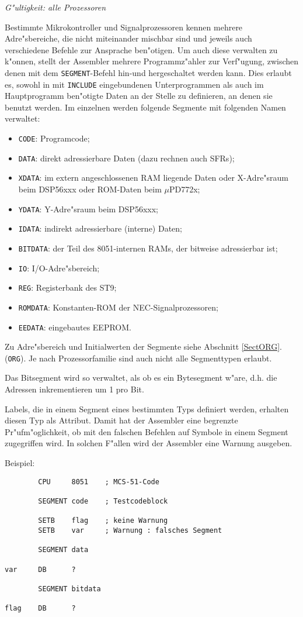 \documentclass[12pt,a4paper,twoside]{report}
\newcommand{\tty}[1]{{\tt #1}}
\begin{document}
{\em G"ultigkeit: alle Prozessoren}

Bestimmte Mikrokontroller und Signalprozessoren kennen mehrere
Adre"sbereiche, die nicht miteinander mischbar sind und jeweils auch
verschiedene Befehle zur Ansprache ben"otigen.  Um auch diese verwalten zu
k"onnen, stellt der Assembler mehrere Programmz"ahler zur Verf"ugung,
zwischen denen mit dem
\tty{SEGMENT}-Befehl hin-und hergeschaltet werden kann.  Dies erlaubt es,
sowohl in mit \tty{INCLUDE} eingebundenen Unterprogrammen als auch im
Hauptprogramm ben"otigte Daten an der Stelle zu definieren, an denen
sie benutzt werden.  Im einzelnen werden folgende Segmente mit folgenden
Namen verwaltet:
\begin{itemize}
\item{\tty{CODE}: Programcode;}
\item{\tty{DATA}: direkt adressierbare Daten (dazu rechnen auch SFRs);}
\item{\tty{XDATA}: im extern angeschlossenen RAM liegende Daten oder
             X-Adre"sraum beim DSP56xxx oder ROM-Daten beim $\mu$PD772x;}
\item{\tty{YDATA}: Y-Adre"sraum beim DSP56xxx;}
\item{\tty{IDATA}: indirekt adressierbare (interne) Daten;}
\item{\tty{BITDATA}: der Teil des 8051-internen RAMs, der bitweise
      adressierbar ist;}
\item{\tty{IO}: I/O-Adre"sbereich;}
\item{\tty{REG}: Registerbank des ST9;}
\item{\tty{ROMDATA}: Konstanten-ROM der NEC-Signalprozessoren;}
\item{\tty{EEDATA}: eingebautes EEPROM.}
\end{itemize}
Zu Adre"sbereich und Initialwerten der Segmente siehe Abschnitt \ref{SectORG}.
(\tty{ORG}).  Je nach Prozessorfamilie sind auch nicht alle Segmenttypen
erlaubt.
\par
Das Bitsegment wird so verwaltet, als ob es ein Bytesegment w"are,
d.h. die Adressen inkrementieren um 1 pro Bit.
\par
Labels, die in einem Segment eines bestimmten Typs definiert werden,
erhalten diesen Typ als Attribut.  Damit hat der Assembler eine
begrenzte Pr"ufm"oglichkeit, ob mit den falschen Befehlen auf Symbole
in einem Segment zugegriffen wird.  In solchen F"allen wird der
Assembler eine Warnung ausgeben.
\par
Beispiel:
\begin{verbatim}
        CPU     8051    ; MCS-51-Code

        SEGMENT code    ; Testcodeblock

        SETB    flag    ; keine Warnung
        SETB    var     ; Warnung : falsches Segment

        SEGMENT data

var     DB      ?

        SEGMENT bitdata

flag    DB      ?
\end{verbatim}
\end{document}
